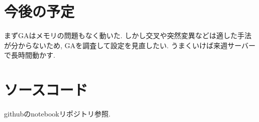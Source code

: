 \documentclass[twocolumn]{jarticle}     %
\begin{document}
\section{今後の予定}

まずGAはメモリの問題もなく動いた.
しかし交叉や突然変異などは適した手法が分からないため,
GAを調査して設定を見直したい.
うまくいけば来週サーバーで長時間動かす.

\begin{itemize}
\end{itemize}

\section{ソースコード}
githubのnotebookリポジトリ参照.



\end{document}
